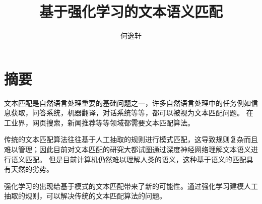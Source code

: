 \confidential{}%
\title{基于强化学习的文本语义匹配}%
\author{何逸轩}%
\advisorsec{}%
\maketitle
\makeenglishtitle
\makedeclaration
\chapter*{摘\quad 要}
\setcounter{page}{1}%

文本匹配是自然语言处理重要的基础问题之一，许多自然语言处理中的任务例如信息获取，问答系统，机器翻译，对话系统等等，都可以被视为文本匹配问题。
在工业界，网页搜索，新闻推荐等等领域都需要文本匹配算法。

传统的文本匹配算法往往基于人工抽取的规则进行模式匹配，这导致规则复杂而且难以管理；因此目前对文本匹配的研究大都试图通过深度神经网络理解文本语义进行语义匹配。
但是目前计算机仍然难以理解人类的语义，这种基于语义的匹配具有天然的劣势。

强化学习的出现给基于模式的文本匹配带来了新的可能性。通过强化学习建模人工抽取的规则，可以解决传统的文本匹配算法的问题。

